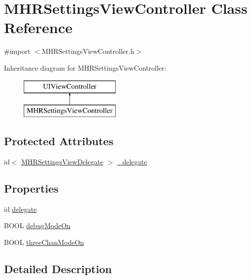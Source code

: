 \hypertarget{interface_m_h_r_settings_view_controller}{\section{M\+H\+R\+Settings\+View\+Controller Class Reference}
\label{interface_m_h_r_settings_view_controller}
}


{\ttfamily \#import $<$M\+H\+R\+Settings\+View\+Controller.\+h$>$}

Inheritance diagram for M\+H\+R\+Settings\+View\+Controller\+:\begin{figure}[H]
\begin{center}
\leavevmode
\includegraphics[height=2.000000cm]{interface_m_h_r_settings_view_controller}
\end{center}
\end{figure}
\subsection*{Protected Attributes}
\begin{DoxyCompactItemize}
\item 
id$<$ \hyperlink{protocol_m_h_r_settings_view_delegate-p}{M\+H\+R\+Settings\+View\+Delegate} $>$ \hyperlink{interface_m_h_r_settings_view_controller_a6fa685e4f9358a047d6f1cfd77f7ac0f}{\+\_\+delegate}
\end{DoxyCompactItemize}
\subsection*{Properties}
\begin{DoxyCompactItemize}
\item 
id \hyperlink{interface_m_h_r_settings_view_controller_a44380e171f6d773f58dc158ff58d47aa}{delegate}
\item 
B\+O\+O\+L \hyperlink{interface_m_h_r_settings_view_controller_abb8745a6f5f7529e69628d8f5f4f068e}{debug\+Mode\+On}
\item 
B\+O\+O\+L \hyperlink{interface_m_h_r_settings_view_controller_add55937fcb10a424e5f651d372b4b6a9}{three\+Chan\+Mode\+On}
\end{DoxyCompactItemize}


\subsection{Detailed Description}


